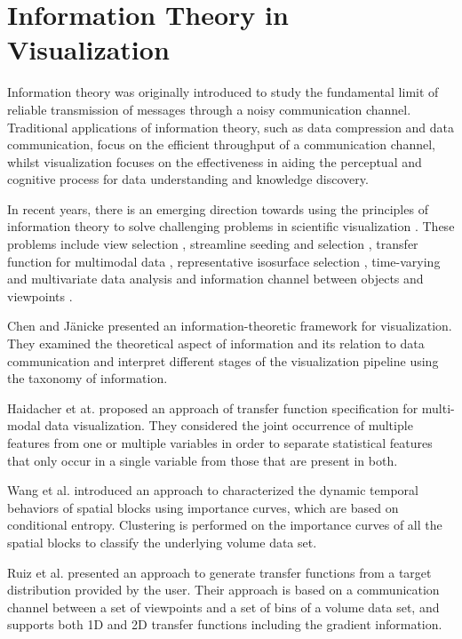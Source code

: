 \section{Information Theory in Visualization}
Information theory \cite{shannon_mathematical_1948} was originally introduced to study the fundamental limit of reliable transmission of messages through a noisy communication channel. Traditional applications of information theory, such as data compression and data communication, focus on the efficient throughput of a communication channel, whilst visualization focuses on the effectiveness in aiding the perceptual and cognitive process for data understanding and knowledge discovery.

In recent years, there is an emerging direction towards using the principles of information theory to solve challenging problems in scientific visualization \cite{wang_information_2011}. These problems include view selection \cite{bordoloi_view_2005} \cite{takahashi_feature-driven_2005} \cite{feixas_unified_2009}, streamline seeding and selection \cite{xu_information-theoretic_2010} \cite{lee_view_2011}, transfer function for multimodal data \cite{bramon_multimodal_2012}, representative isosurface selection \cite{wang_lod_2006}, time-varying and multivariate data analysis \cite{wang_importance-driven_2008} and information channel between objects and viewpoints \cite{ruiz_viewpoint_2010}.

Chen and J{\"a}nicke \cite{chen_information-theoretic_2010} presented an information-theoretic framework for visualization. They examined the theoretical aspect of information and its relation to data communication and interpret different stages of the visualization pipeline using the taxonomy of information.

Haidacher et at. \cite{haidacher_information-based_2008} proposed an approach of transfer function specification for multi-modal data visualization. They considered the joint occurrence of multiple features from one or multiple variables in order to separate statistical features that only occur in a single variable from those that are present in both.

Wang et al. \cite{wang_importance-driven_2008} introduced an approach to characterized the dynamic temporal behaviors of spatial blocks using importance curves, which are based on conditional entropy. Clustering is performed on the importance curves of all the spatial blocks to classify the underlying volume data set.

Ruiz et al. \cite{ruiz_automatic_2011} presented an approach to generate transfer functions from a target distribution provided by the user. Their approach is based on a communication channel between a set of viewpoints and a set of bins of a volume data set, and supports both 1D and 2D transfer functions including the gradient information.

